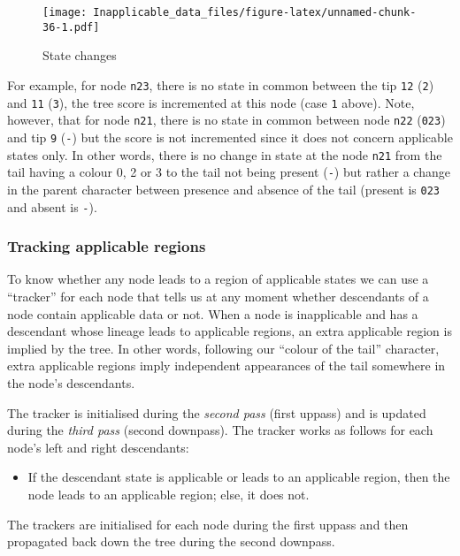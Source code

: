 \documentclass[]{book}
\providecommand{\tightlist}{%
  \setlength{\itemsep}{0pt}\setlength{\parskip}{0pt}}
\theoremstyle{definition}
\theoremstyle{definition}
\theoremstyle{definition}
\theoremstyle{remark}
\begin{document}
\begin{figure}
\centering
\texttt{[image: Inapplicable\_data\_files/figure-latex/unnamed-chunk-36-1.pdf]}
\caption{\label{fig:unnamed-chunk-36}State changes}
\end{figure}

For example, for node \texttt{n23}, there is no state in common between
the tip \texttt{12} (\texttt{2}) and \texttt{11} (\texttt{3}), the tree
score is incremented at this node (case \texttt{1} above). Note,
however, that for node \texttt{n21}, there is no state in common between
node \texttt{n22} (\texttt{023}) and tip \texttt{9} (\texttt{-}) but the
score is not incremented since it does not concern applicable states
only. In other words, there is no change in state at the node
\texttt{n21} from the tail having a colour 0, 2 or 3 to the tail not
being present (\texttt{-}) but rather a change in the parent character
between presence and absence of the tail (present is \texttt{023} and
absent is \texttt{-}).

\subsubsection{Tracking applicable
regions}\label{tracking-applicable-regions}

To know whether any node leads to a region of applicable states we can
use a ``tracker'' for each node that tells us at any moment whether
descendants of a node contain applicable data or not. When a node is
inapplicable and has a descendant whose lineage leads to applicable
regions, an extra applicable region is implied by the tree. In other
words, following our ``colour of the tail'' character, extra applicable
regions imply independent appearances of the tail somewhere in the
node's descendants.

The tracker is initialised during the \emph{second pass} (first uppass)
and is updated during the \emph{third pass} (second downpass). The
tracker works as follows for each node's left and right descendants:

\begin{itemize}
\tightlist
\item
  If the descendant state is applicable or leads to an applicable
  region, then the node leads to an applicable region; else, it does
  not.
\end{itemize}

The trackers are initialised for each node during the first uppass and
then propagated back down the tree during the second downpass.
\end{document}

